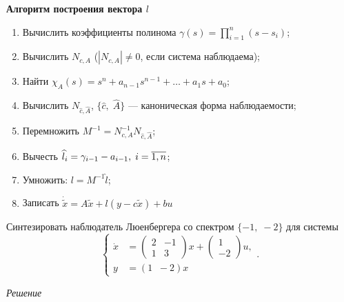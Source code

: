 \documentclass[../../TAU.tex]{subfiles}
\begin{document}
    \textbf{Алгоритм построения вектора $l$}

    \begin{enumerate}
        \item Вычислить коэффициенты полинома $\gamma(s) = \prod_{i=1}^{n}(s-s_i)$;
        \item Вычислить $N_{c,A}$ ($|N_{c,A}|\neq0$, если система наблюдаема);
        \item Найти $\chi_A(s) = s^n + a_{n-1}s^{n-1} + \ldots + a_1 s + a_0$;
        \item Вычислить $N_{\widehat c, \widehat A}$, $\{\widehat c,\; \widehat A\}$ --- каноническая форма наблюдаемости;
        \item Перемножить $M^{-1} = N^{-1}_{c, A} N_{\widehat c, \widehat A}$;
        \item Вычесть $\widehat l_i = \gamma_{i-1} - a_{i-1}, \; i=\overline{1,n}$;
        \item Умножить: $l =  M^{-1}\widehat l$;
        \item Записать $\dot{\tilde x} = A\tilde x + l(y - c\tilde x ) + b u$
    \end{enumerate}


    \examp
    {
        Синтезировать наблюдатель Люенбергера со спектром $\{-1,\; -2\}$ для системы
        $$
            \left\{
            \begin{aligned}
            \dot x &=
            \begin{pmatrix}
            2 & -1\\
            1 & 3
            \end{pmatrix}
             x + \begin{pmatrix}1\\ -2\end{pmatrix}u,\\
            y &= (1\;\; -2) x
            \end{aligned}
            \right..
        $$
    }

    \textit{Решение}
\end{document}

